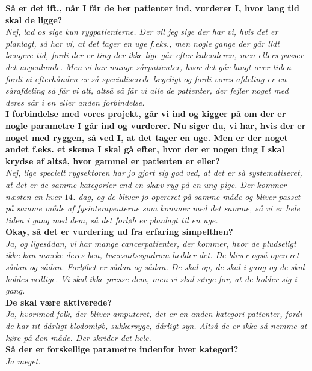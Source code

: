 \noindent
\textbf{Så er det ift., når I får de her patienter ind, vurderer I, hvor lang tid skal de ligge?}\\
\noindent
\textit{Nej, lad os sige kun rygpatienterne. Der vil jeg sige der har vi, hvis det er planlagt, så har vi, at det tager en uge f.eks., men nogle gange der går lidt længere tid, fordi der er ting der ikke lige går efter kalenderen, men ellers passer det nogenlunde. Men vi har mange sårpatienter, hvor det går langt over tiden fordi vi efterhånden er så specialiserede lægeligt og fordi vores afdeling er en sårafdeling så får vi alt, altså så får vi alle de patienter, der fejler noget med deres sår i en eller anden forbindelse.}\\
\noindent
\textbf{I forbindelse med vores projekt, går vi ind og kigger på om der er nogle parametre I går ind og vurderer. Nu siger du, vi har, hvis der er noget med ryggen, så ved I, at det tager en uge. Men er der noget andet f.eks. et skema I skal gå efter, hvor der er nogen ting I skal krydse af altså, hvor gammel er patienten er eller?}\\
\noindent
\textit{Nej, lige specielt rygsektoren har jo gjort sig god ved, at det er så systematiseret, at det er de samme kategorier end en skæv ryg på en ung pige. Der kommer næsten en hver $14$. dag, og de bliver jo opereret på samme måde og bliver passet på samme måde af fysioterapeuterne som kommer med det samme, så vi er hele tiden i gang med dem, så det forløb er planlagt til en uge.}\\
\noindent
\textbf{Okay, så det er vurdering ud fra erfaring simpelthen?}\\
\noindent
\textit{Ja, og ligesådan, vi har mange cancerpatienter, der kommer, hvor de pludseligt ikke kan mærke deres ben,  tværsnitssyndrom hedder det. De bliver også opereret sådan og sådan. Forløbet er sådan og sådan. De  skal op, de skal i gang og de skal holdes vedlige. Vi skal ikke presse dem, men vi skal sørge for, at de holder sig i gang.}\\
\noindent
\textbf{De skal være aktiverede?}\\
\noinden
\textit{Ja, hvorimod folk, der bliver amputeret, det er en anden kategori patienter, fordi de har tit dårligt blodomløb, sukkersyge, dårligt syn. Altså de er ikke så nemme at køre på den måde. Der skrider det hele.}\\
\noindent
\textbf{Så der er forskellige parametre indenfor hver kategori?}\\
\noindent
\textit{Ja meget.}\\
